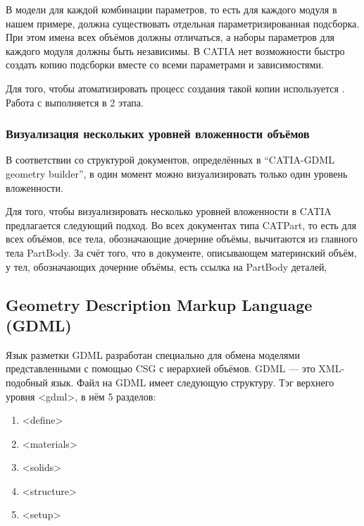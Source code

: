 В модели для каждой комбинации параметров, то есть для каждого модуля в нашем примере, должна существовать отдельная параметризированная подсборка. При этом имена всех объёмов должны отличаться, а наборы параметров для каждого модуля должны быть независимы. В CATIA нет возможности быстро создать копию подсборки вместе со всеми параметрами и зависимостями.

Для того, чтобы атоматизировать процесс создания такой копии используется .
Работа с  выполняется в 2 этапа.

\todo

\subsubsection{Визуализация нескольких уровней вложенности объёмов}\label{sec:MultiLevelVis}

В соответствии со структурой документов, определённых в ``CATIA-GDML geometry builder'', в один момент можно визуализировать только один уровень вложенности.

Для того, чтобы визуализировать несколько уровней вложенности в CATIA предлагается следующий подход. Во всех документах типа CATPart, то есть для всех объёмов, все тела, обозначающие дочерние объёмы, вычитаются из главного тела PartBody. За счёт того, что в документе, описывающем материнский объём, у тел, обозначающих дочерние объёмы, есть ссылка на PartBody деталей, 
\todo

\subsection{Geometry Description Markup Language (GDML)}\label{sec:GDML}

Язык разметки GDML разработан специально для обмена моделями представленными с помощью CSG с иерархией объёмов. GDML --- это XML-подобный язык. Файл на GDML имеет следующую структуру. Тэг верхнего уровня <gdml>, в нём 5 разделов:
\begin{enumerate}
\item <define>
\item <materials>
\item <solids>
\item <structure>
\item <setup>
\end{enumerate}


